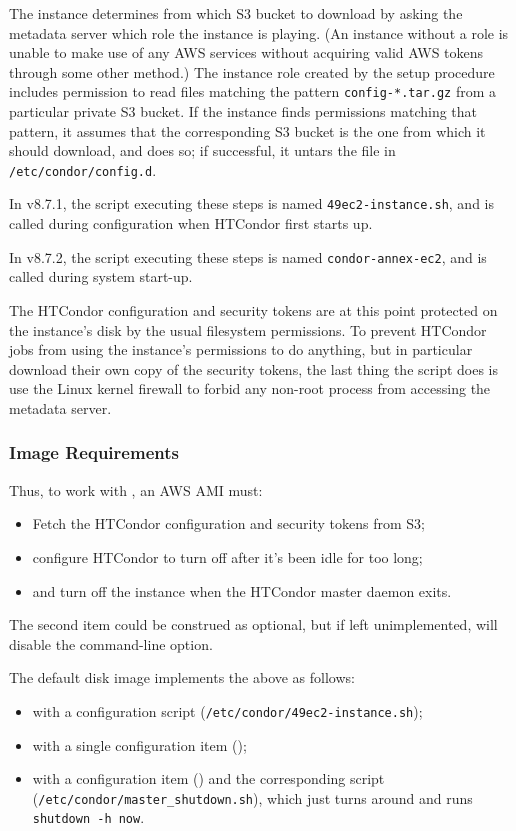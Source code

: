The instance determines from which S3 bucket to download by asking the
metadata server which role the instance is playing.  (An instance without
a role is unable to make use of any AWS services without acquiring valid
AWS tokens through some other method.)  The instance role created by
the setup procedure includes permission to read files matching the pattern
{\tt config-*.tar.gz} from a particular private S3 bucket.  If the instance
finds permissions matching that pattern, it assumes that the corresponding
S3 bucket is the one from which it should download, and does so; if
successful, it untars the file in {\tt /etc/condor/config.d}.

In v8.7.1, the script executing these steps is named {\tt 49ec2-instance.sh},
and is called during configuration when HTCondor first starts up.

In v8.7.2, the script executing these steps is named {\tt condor-annex-ec2},
and is called during system start-up.

The HTCondor configuration and security tokens are at this point protected
on the instance's disk by the usual filesystem permissions.  To prevent
HTCondor jobs from using the instance's permissions to do anything, but
in particular download their own copy of the security tokens, the last
thing the script does is use the Linux kernel firewall to forbid any
non-root process from accessing the metadata server.

\subsubsection{Image Requirements}

Thus, to work with , an AWS AMI must:

\begin{itemize}
\item  Fetch the HTCondor configuration and security tokens from S3;
\item  configure HTCondor to turn off after it's been idle for too long;
\item  and turn off the instance when the HTCondor master daemon exits.
\end{itemize}

The second item could be construed as optional, but if left unimplemented,
will disable the  command-line option.

The default disk image implements the above as follows:

\begin{itemize}
\item  with a configuration script ({\tt /etc/condor/49ec2-instance.sh});
\item  with a single configuration item ();
\item  with a configuration item ()
and the corresponding script ({\tt /etc/condor/master\_shutdown.sh}), which
just turns around and runs {\tt shutdown -h now}.
\end{itemize}

